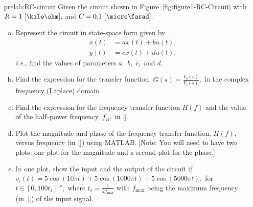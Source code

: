 \begin{prelab}{prelab:RC-circuit}
Given the circuit shown in Figure~\ref{fig:figure1-RC-Circuit} with $R = 1~[\kilo\ohm],$ and $C = 0.1~[\micro\farad].$ 
      \begin{enumerate}[(a)]
      \item  Represent the circuit in state-space form given by 
        \begin{align*}
          \dot x(t) &= a x(t) + bu(t),\\
          y(t) &= cx(t) + du(t),
        \end{align*}
        \textit{i.e.}, find the values of parameters $a,$ $b,$ $c,$ and $d.$ 
      \item Find the expression for the transfer function, $G(s) = \frac{V_o(s)}{V_i(s)},$ in the complex frequency (Laplace) domain.
        
      \item Find the expression for the frequency transfer function $H(f)$ and the value of the half--power frequency, $f_B,$ in [\hertz].
      \item Plot the magnitude and phase of the frequency transfer function, $H(f),$ versus frequency (in [\hertz]) using MATLAB. [Note: You will need to have two plots;  one plot for the magnitude and a second plot for the phase.]        
      \item  In one plot, show the input and the output of the circuit if $v_i(t) = 5\cos(10\pi t) + 5\cos(1000\pi t) +5\cos(5000\pi t),$ for $t\in[0,100t_s]~\second,$ where $t_s=\frac{1}{2f_{\mathrm{max}}}$ with $f_{\mathrm{max}}$ being the maximum frequency  (in~[\hertz])  of the input signal.
        \end{enumerate}
\end{prelab}

